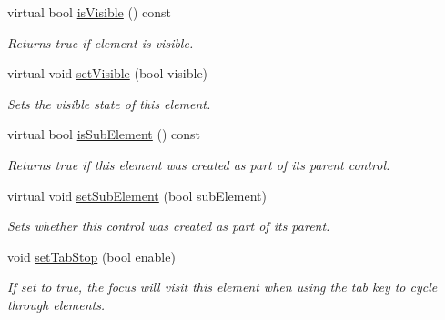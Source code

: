 \begin{DoxyCompactItemize}
\mbox{\label{classirr_1_1gui_1_1IGUIElement_a9cb14270ab55bdfe45442542b35567a7}} 
virtual bool \hyperlink{classirr_1_1gui_1_1IGUIElement_a9cb14270ab55bdfe45442542b35567a7}{is\+Visible} () const
\begin{DoxyCompactList}\small\item\em Returns true if element is visible. \end{DoxyCompactList}\item 
\mbox{\label{classirr_1_1gui_1_1IGUIElement_aed537cb0b16c670b8f895179f0027bad}} 
virtual void \hyperlink{classirr_1_1gui_1_1IGUIElement_aed537cb0b16c670b8f895179f0027bad}{set\+Visible} (bool visible)
\begin{DoxyCompactList}\small\item\em Sets the visible state of this element. \end{DoxyCompactList}\item 
\mbox{\label{classirr_1_1gui_1_1IGUIElement_aa85661a9ebba0f46d6e7c7e0da92f4cd}} 
virtual bool \hyperlink{classirr_1_1gui_1_1IGUIElement_aa85661a9ebba0f46d6e7c7e0da92f4cd}{is\+Sub\+Element} () const
\begin{DoxyCompactList}\small\item\em Returns true if this element was created as part of its parent control. \end{DoxyCompactList}\item 
virtual void \hyperlink{classirr_1_1gui_1_1IGUIElement_a50eb859808b65ee24fbdd69e69118a8d}{set\+Sub\+Element} (bool sub\+Element)
\begin{DoxyCompactList}\small\item\em Sets whether this control was created as part of its parent. \end{DoxyCompactList}\item 
void \hyperlink{classirr_1_1gui_1_1IGUIElement_a58b9b6a8715b4959dda905dbc028ece6}{set\+Tab\+Stop} (bool enable)
\begin{DoxyCompactList}\small\item\em If set to true, the focus will visit this element when using the tab key to cycle through elements. \end{DoxyCompactList}\item 
\mbox{\label{classirr_1_1gui_1_1IGUIElement_a0f9c536acf8a57faa18d61ff5b0bf567}} 

\end{DoxyCompactItemize}
